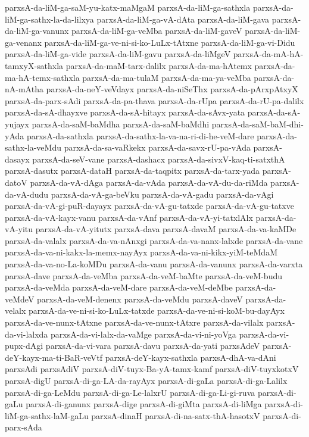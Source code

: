 {parxsA-da-liM-ga-saM-yu-katx-maMgaM
parxsA-da-liM-ga-sathxla
parxsA-da-liM-ga-sathx-la-da-lilxya
parxsA-da-liM-ga-vA-dAta
parxsA-da-liM-gava
parxsA-da-liM-ga-vanunx
parxsA-da-liM-ga-veMba
parxsA-da-liM-gaveV
parxsA-da-liM-ga-venanx
parxsA-da-liM-ga-ve-ni-si-ko-LuLx-tAtxne
parxsA-da-liM-ga-vi-Didu
parxsA-da-liM-ga-vide
parxsA-da-liM-gavu
parxsA-da-liMgeV
parxsA-da-mA-hA-tamxyX-sathxla
parxsA-da-maM-tarx-dalilx
parxsA-da-ma-hAtemx
parxsA-da-ma-hA-temx-sathxla
parxsA-da-ma-tulaM
parxsA-da-ma-ya-veMba
parxsA-da-nA-mAtha
parxsA-da-neY-veVdayx
parxsA-da-niSeThx
parxsA-da-pArxpAtxyX
parxsA-da-parx-sAdi
parxsA-da-pa-thava
parxsA-da-rUpa
parxsA-da-rU-pa-dalilx
parxsA-da-sA-dhayxve
parxsA-da-sA-hitayx
parxsA-da-sAvx-yata
parxsA-da-sA-yujayx
parxsA-da-saM-baMdha
parxsA-da-saM-baMdhi
parxsA-da-saM-baM-dhi-yAda
parxsA-da-sathxla
parxsA-da-sathx-la-va-na-ri-di-he-veM-dare
parxsA-da-sathx-la-veMdu
parxsA-da-sa-vaRkekx
parxsA-da-savx-rU-pa-vAda
parxsA-dasayx
parxsA-da-seV-vane
parxsA-dashacx
parxsA-da-sivxV-kaq-ti-satxthA
parxsA-dasutx
parxsA-dataH
parxsA-da-taqpitx
parxsA-da-tarx-yada
parxsA-datoV
parxsA-da-vA-dAga
parxsA-da-vAda
parxsA-da-vA-du-da-riMda
parxsA-da-vA-dudu
parxsA-da-vA-ga-beVku
parxsA-da-vA-gadu
parxsA-da-vAgi
parxsA-da-vA-gi-puR-dayayx
parxsA-da-vA-gu-tatxde
parxsA-da-vA-gu-tatxve
parxsA-da-vA-kayx-vanu
parxsA-da-vAnf
parxsA-da-vA-yi-tatxlAlx
parxsA-da-vA-yitu
parxsA-da-vA-yitutx
parxsA-dava
parxsA-davaM
parxsA-da-va-kaMDe
parxsA-da-valalx
parxsA-da-va-nAnxgi
parxsA-da-va-nanx-lalxde
parxsA-da-vane
parxsA-da-va-ni-kakx-la-memx-nayAyx
parxsA-da-va-ni-kikx-yiM-teMdaM
parxsA-da-va-no-La-koMDu
parxsA-da-vanu
parxsA-da-vanunx
parxsA-da-varxta
parxsA-dave
parxsA-da-veMba
parxsA-da-veM-baMte
parxsA-da-veM-budu
parxsA-da-veMda
parxsA-da-veM-dare
parxsA-da-veM-deMbe
parxsA-da-veMdeV
parxsA-da-veM-denenx
parxsA-da-veMdu
parxsA-daveV
parxsA-da-velalx
parxsA-da-ve-ni-si-ko-LuLx-tatxde
parxsA-da-ve-ni-si-koM-bu-dayAyx
parxsA-da-ve-nunx-tAtxne
parxsA-da-ve-nunx-tAtxre
parxsA-da-vilalx
parxsA-da-vi-lalxda
parxsA-da-vi-lalx-da-vaMge
parxsA-da-vi-ni-yoVga
parxsA-da-vi-pupx-dAgi
parxsA-da-vi-vara
parxsA-davu
parxsA-da-yati
parxsAdeV
parxsA-deY-kayx-ma-ti-BaR-veVtf
parxsA-deY-kayx-sathxla
parxsA-dhA-va-dAni
parxsAdi
parxsAdiV
parxsA-diV-tuyx-Ba-yA-tamx-kamf
parxsA-diV-tuyxkotxV
parxsA-digU
parxsA-di-ga-LA-da-rayAyx
parxsA-di-gaLa
parxsA-di-ga-Lalilx
parxsA-di-ga-LeMdu
parxsA-di-ga-Le-lalxrU
parxsA-di-ga-Li-gi-ruva
parxsA-di-gaLu
parxsA-di-ganunx
parxsA-dige
parxsA-di-giMta
parxsA-di-liMga
parxsA-di-liM-ga-sathx-laM-gaLu
parxsA-dinaH
parxsA-di-na-satx-thA-hasotxV
parxsA-di-parx-sAda
}

